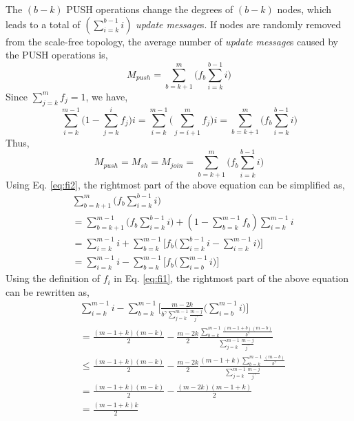 The $(b-k)$ PUSH operations change the degrees of $(b-k)$ nodes, which leads to a total of $(\sum_{i=k}^{b-1} i)$ \textit{update message}s. If nodes are randomly removed from the scale-free topology, the average number of \textit{update message}s caused by the PUSH operations is,
\begin{equation}
M_{push} =   \sum_{b=k+1}^{m} \big( f_b \sum_{i=k}^{b-1} i \big)
\end{equation}
Since $\sum_{j=k}^{m} f_j = 1$, we have,
\begin{equation}
\sum_{i=k}^{m-1} \big( 1 - \sum_{j=k}^{i} f_j \big) i =\sum_{i=k}^{m-1} \big( \sum_{j=i+1}^{m} f_j \big) i = \sum_{b=k+1}^{m} \Big( f_b \sum_{i=k}^{b-1} i \Big)
\end{equation}
Thus,
\begin{equation}
M_{push} = M_{sh} = M_{join} = \sum_{b=k+1}^{m} \big( f_b \sum_{i=k}^{b-1} i \big)
\end{equation}
Using Eq. \ref{eq:fi2}, the rightmost part of the above equation can be simplified as,
\begin{equation}
\begin{array}{ll}
&\sum_{b=k+1}^{m} \Big( f_b \sum_{i=k}^{b-1} i \Big)\\
&= \sum_{b=k+1}^{m-1} \Big( f_b \sum_{i=k}^{b-1} i \Big) + ( 1 - \sum _{b=k}^{m-1} f_b) \sum_{i=k}^{m-1} i\\
&= \sum_{i=k}^{m-1} i + \sum_{b=k}^{m-1} \Big[ f_b \big( \sum_{i=k}^{b-1} i - \sum_{i=k}^{m-1} i \big) \Big]\\
&= \sum_{i=k}^{m-1} i - \sum_{b=k}^{m-1} \Big[ f_b \big( \sum_{i=b}^{m-1} i \big) \Big]
\end{array}
\end{equation}
Using the definition of $f_i$ in Eq. \ref{eq:fi1}, the rightmost part of the above equation can be rewritten as,
\begin{equation}
\begin{array}{ll}
&\sum_{i=k}^{m-1} i - \sum_{b=k}^{m-1} \Big[ \frac{m - 2 k}{ b^\gamma \sum_{j=k}^{m-1} \frac{m-j}{j^\gamma}  } \big( \sum_{i=b}^{m-1} i \big) \Big] \\
&= \frac{(m-1+k)(m-k)}{2} - \frac{m - 2 k}{2} 
\frac{\sum_{b=k}^{m-1} \frac{(m-1+b)(m-b)}{  b^\gamma } } {\sum_{j=k}^{m-1} \frac{m-j}{j^\gamma}} \\
&\leq \frac{(m-1+k)(m-k)}{2} - \frac{m - 2 k}{2} 
\frac{(m-1+k)\sum_{b=k}^{m-1} \frac{(m-b)}{  b^\gamma } } {\sum_{j=k}^{m-1} \frac{m-j}{j^\gamma}} \\
&=  \frac{(m-1+k)(m-k)}{2} - \frac{(m - 2 k)(m - 1 + k)}{2}\\
&= \frac{(m - 1 + k)k}{2} 
\end{array}
\end{equation}

